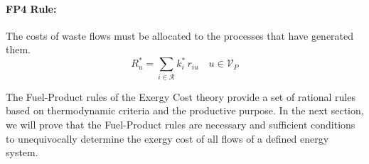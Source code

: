 \documentclass{ecos2018}
\begin{document}
\paragraph{FP4 Rule:} The costs of waste flows must be allocated to the processes that have generated them.
\begin{equation}
\label{eq:fprule4}
R_u^*=\sum_{i\in\mathcal{R}}{k_i^* \, r_{iu}} \quad u\in\mathcal{V}_P \tag{FP4}
\end{equation}

The Fuel-Product rules of the Exergy Cost theory provide a set of rational rules based on thermodynamic criteria and the productive purpose. In the next section, we will prove that the Fuel-Product rules are necessary and sufficient conditions to unequivocally determine the exergy cost of all flows of a defined energy system.
\end{document}
